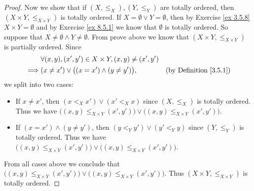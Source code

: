 \begin{proof}
    Now we show that if \((X, \leq_X), (Y, \leq_Y)\) are totally ordered, then \((X \times Y, \leq_{X \times Y})\) is totally ordered.
    If \(X = \emptyset \lor Y = \emptyset\), then by Exercise \ref{ex 3.5.8} \(X \times Y = \emptyset\) and by Exercise \ref{ex 8.5.1} we know that \(\emptyset\) is totally ordered.
    So suppose that \(X \neq \emptyset \land Y \neq \emptyset\).
    From prove above we know that \((X \times Y, \leq_{X \times Y})\) is partially ordered.
    Since
    \begin{align*}
                 & \forall (x, y), (x', y') \in X \times Y, (x, y) \neq (x', y')                                      \\
        \implies & (x \neq x') \lor \big((x = x') \land (y \neq y')\big),        & \text{(by Definition \ref{3.5.1})}
    \end{align*}
    we split into two cases:
    \begin{itemize}
        \item If \(x \neq x'\), then \((x <_X x') \lor (x' <_X x)\) since \((X, \leq_X)\) is totally ordered.
              Thus we have \(\big((x, y) \leq_{X \times Y} (x', y')\big) \lor \big((x, y) \leq_{X \times Y} (x', y')\big)\).
        \item If \((x = x') \land (y \neq y')\), then \((y <_Y y') \lor (y' <_Y y)\) since \((Y, \leq_Y)\) is totally ordered.
              Thus we have \(\big((x, y) \leq_{X \times Y} (x', y')\big) \lor \big((x, y) \leq_{X \times Y} (x', y')\big)\).
    \end{itemize}
    From all cases above we conclude that \(\big((x, y) \leq_{X \times Y} (x', y')\big) \lor \big((x, y) \leq_{X \times Y} (x', y')\big)\).
    Thus \((X \times Y, \leq_{X \times Y})\) is totally ordered.


\end{proof}
